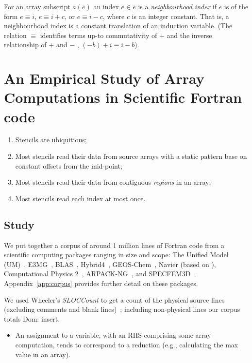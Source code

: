 \documentclass[acmlarge,review,anonymous]{acmart}\settopmatter{printfolios=true}
\theoremstyle{definition}
\theoremstyle{plain}
\newcommand{\dnote}[1]{\textcolor{darkpurple}{Dom: #1}}
\begin{document}
\begin{definition}
\label{def:neighbour}
  For an array subscript $a(\bar{e})$ an index $e \in \bar{e}$ is a
  \emph{neighbourhood index} if $e$ is of the form $e \equiv i$, $e \equiv i +
  c$, or $e \equiv i - c$, where $c$ is an integer constant. That is, a
  neighbourhood index is a constant translation of an induction variable. (The
  relation $\equiv$ identifies terms up-to commutativity of $+$ and the inverse
  relationship of $+$ and $-$ \eg{}, $(-b) + i \equiv i - b$).
\end{definition}

\section{An Empirical Study of Array Computations in Scientific Fortran code}



\begin{enumerate}
\item Stencils are ubiquitious;
\item Most stencils read their data from source arrays with a static pattern
base on constant offsets from the mid-point;
\item Most stencils read their data from contiguous \emph{regions} in an array;
\item Most stencils read each index at most once.
\end{enumerate}

\subsection{Study}
%
\noindent
We put together a corpus of around 1 million lines of Fortran code from a
\numPackages{} scientific computing packages ranging in size and scope: The Unified Model (UM)~\cite{um},
E3MG~\cite{RePEc:aen:journl:2006se-a12}, BLAS~\cite{blas},
Hybrid4~\cite{GBC:GBC635}, GEOS-Chem~\cite{geos-chem}, Navier (based
on \cite{griebel1997numerical}), Computational Physics
2~\cite{nicholas2006computational},
ARPACK-NG~\cite{arpackng}, and
SPECFEM3D~\cite{specfem3d}. Appendix~\ref{app:corpus} provides
further detail on these packages.

We used Wheeler's \emph{SLOCCount} to get a count of the physical
source lines (excluding comments and blank
lines)~\cite{wheeler2001sloccount}; including non-physical lines
 our corpus totals \dnote{insert}.


\begin{itemize}
\item An assignment to a variable, with an RHS comprising some array
  computation, tends to correspond to a reduction (e.g., calculating
the max value in an array).

\end{itemize}
\end{document}
